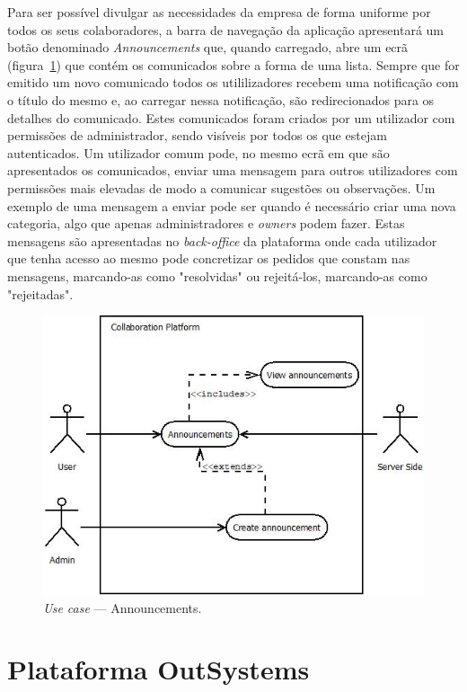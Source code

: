 Para ser possível divulgar as necessidades da empresa de forma uniforme por todos os seus colaboradores, a barra de navegação da aplicação apresentará 
um botão denominado \textit{Announcements} que, quando carregado, abre um ecrã  (figura~\ref{fig:uc:announcements}) que contém os comunicados sobre a forma de uma lista. 
Sempre que for emitido um novo comunicado todos os utililizadores recebem uma notificação com o título do mesmo e, ao carregar nessa notificação, são redirecionados para os detalhes do comunicado. 
Estes comunicados foram criados por um utilizador com permissões de administrador, sendo visíveis por todos os que estejam autenticados.
Um utilizador comum pode, no mesmo ecrã em que são apresentados os comunicados, enviar uma mensagem para outros utilizadores com permissões mais elevadas de modo a comunicar sugestões ou observações. 
Um exemplo de uma mensagem a enviar pode ser quando é necessário criar uma nova categoria, algo que apenas administradores e \textit{owners} podem fazer.
Estas mensagens são apresentadas no \textit{back-office} da plataforma onde cada utilizador que tenha acesso ao mesmo pode concretizar os pedidos que constam nas mensagens, marcando-as como "resolvidas" ou rejeitá-los, marcando-as como "rejeitadas".

\begin{figure}[H]
    \centering
    \includegraphics[scale=0.6]{figures/Announcements use case.jpeg}
    \caption{\textit{Use case} --- Announcements.}\label{fig:uc:announcements}
\end{figure}

\section{Plataforma OutSystems}\label{sec:plataformaOutSystems}

